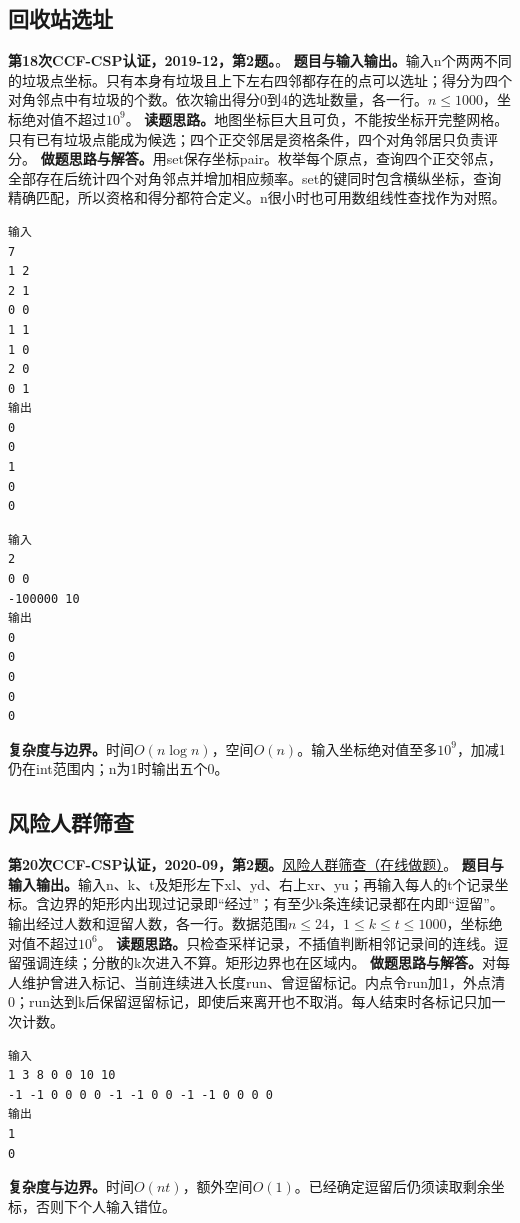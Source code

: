 \subsection{回收站选址}
\textbf{第18次CCF-CSP认证，2019-12，第2题。}。
\textbf{题目与输入输出。}输入n个两两不同的垃圾点坐标。只有本身有垃圾且上下左右四邻都存在的点可以选址；得分为四个对角邻点中有垃圾的个数。依次输出得分0到4的选址数量，各一行。$n\le1000$，坐标绝对值不超过$10^9$。
\textbf{读题思路。}地图坐标巨大且可负，不能按坐标开完整网格。只有已有垃圾点能成为候选；四个正交邻居是资格条件，四个对角邻居只负责评分。
\textbf{做题思路与解答。}用set保存坐标pair。枚举每个原点，查询四个正交邻点，全部存在后统计四个对角邻点并增加相应频率。set的键同时包含横纵坐标，查询精确匹配，所以资格和得分都符合定义。n很小时也可用数组线性查找作为对照。
\begin{verbatim}
输入
7
1 2
2 1
0 0
1 1
1 0
2 0
0 1
输出
0
0
1
0
0
\end{verbatim}
\begin{verbatim}
输入
2
0 0
-100000 10
输出
0
0
0
0
0
\end{verbatim}
\textbf{复杂度与边界。}时间$O(n\log n)$，空间$O(n)$。输入坐标绝对值至多$10^9$，加减1仍在int范围内；n为1时输出五个0。
\subsection{风险人群筛查}
\textbf{第20次CCF-CSP认证，2020-09，第2题。}\href{https://www.acwing.com/problem/content/3296/}{风险人群筛查（在线做题）}。
\textbf{题目与输入输出。}输入n、k、t及矩形左下xl、yd、右上xr、yu；再输入每人的t个记录坐标。含边界的矩形内出现过记录即“经过”；有至少k条连续记录都在内即“逗留”。输出经过人数和逗留人数，各一行。数据范围$n\le24$，$1\le k\le t\le1000$，坐标绝对值不超过$10^6$。
\textbf{读题思路。}只检查采样记录，不插值判断相邻记录间的连线。逗留强调连续；分散的k次进入不算。矩形边界也在区域内。
\textbf{做题思路与解答。}对每人维护曾进入标记、当前连续进入长度run、曾逗留标记。内点令run加1，外点清0；run达到k后保留逗留标记，即使后来离开也不取消。每人结束时各标记只加一次计数。
\begin{verbatim}
输入
1 3 8 0 0 10 10
-1 -1 0 0 0 0 -1 -1 0 0 -1 -1 0 0 0 0
输出
1
0
\end{verbatim}
\textbf{复杂度与边界。}时间$O(nt)$，额外空间$O(1)$。已经确定逗留后仍须读取剩余坐标，否则下个人输入错位。
